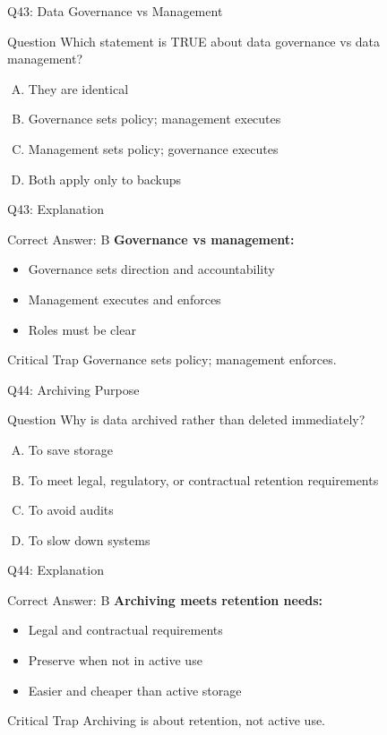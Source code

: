 \documentclass{beamer}
\begin{document}
	\begin{frame}{Q43: Data Governance vs Management}
		\begin{block}{Question}
			Which statement is TRUE about data governance vs data management?
		\end{block}
		\begin{enumerate}[(A)]
			\item They are identical
			\item Governance sets policy; management executes
			\item Management sets policy; governance executes
			\item Both apply only to backups
		\end{enumerate}
	\end{frame}
	
	\begin{frame}{Q43: Explanation}
		\begin{block}{Correct Answer: B}
			\textbf{Governance vs management:}
			\begin{itemize}
				\item Governance sets direction and accountability
				\item Management executes and enforces
				\item Roles must be clear
			\end{itemize}
		\end{block}
		\begin{alertblock}{Critical Trap}
			Governance sets policy; management enforces.
		\end{alertblock}
	\end{frame}
	
	\begin{frame}{Q44: Archiving Purpose}
		\begin{block}{Question}
			Why is data archived rather than deleted immediately?
		\end{block}
		\begin{enumerate}[(A)]
			\item To save storage
			\item To meet legal, regulatory, or contractual retention requirements
			\item To avoid audits
			\item To slow down systems
		\end{enumerate}
	\end{frame}
	
	\begin{frame}{Q44: Explanation}
		\begin{block}{Correct Answer: B}
			\textbf{Archiving meets retention needs:}
			\begin{itemize}
				\item Legal and contractual requirements
				\item Preserve when not in active use
				\item Easier and cheaper than active storage
			\end{itemize}
		\end{block}
		\begin{alertblock}{Critical Trap}
			Archiving is about retention, not active use.
		\end{alertblock}
	\end{frame}
	
\end{document}
